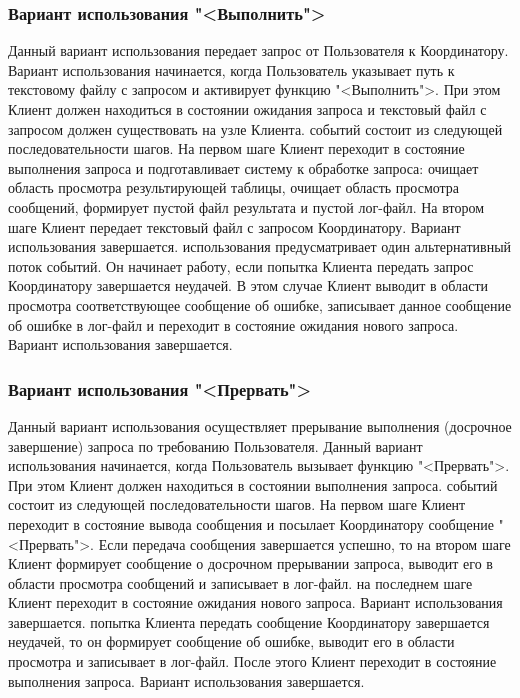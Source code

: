 \documentclass[11pt,oneside]{article}
\begin{document}
\subsubsection{Вариант использования "<Выполнить">}
Данный вариант использования передает запрос от Пользователя к Координатору. Вариант использования начинается, когда Пользователь указывает путь к текстовому файлу с запросом и активирует функцию "<Выполнить">. При этом Клиент должен находиться в состоянии ожидания запроса и текстовый файл с запросом должен существовать на узле Клиента.
 событий состоит из следующей последовательности шагов. На первом шаге Клиент переходит в состояние выполнения запроса и подготавливает систему к обработке запроса: очищает область просмотра результирующей таблицы, очищает область просмотра сообщений, формирует пустой файл результата и пустой лог-файл. На втором шаге Клиент передает текстовый файл с запросом Координатору. Вариант использования завершается.
 использования предусматривает один альтернативный поток событий. Он начинает работу, если попытка Клиента передать запрос Координатору завершается неудачей. В этом случае Клиент выводит в области просмотра соответствующее сообщение об ошибке, записывает данное сообщение об ошибке в лог-файл и переходит в состояние ожидания нового запроса. Вариант использования завершается.

\subsubsection{Вариант использования "<Прервать">}
Данный вариант использования осуществляет прерывание выполнения (досрочное завершение) запроса по требованию Пользователя. Данный вариант использования начинается, когда Пользователь вызывает функцию "<Прервать">. При этом Клиент должен находиться в состоянии выполнения запроса.
 событий состоит из следующей последовательности шагов. На первом шаге Клиент переходит в состояние вывода сообщения и посылает Координатору сообщение "<Прервать">. Если передача сообщения завершается успешно, то на втором шаге Клиент формирует сообщение о досрочном прерывании запроса, выводит его в области просмотра сообщений и записывает в лог-файл. на последнем шаге Клиент переходит в состояние ожидания нового запроса. Вариант использования завершается.
 попытка Клиента передать сообщение Координатору завершается неудачей, то он формирует сообщение об ошибке, выводит его в области просмотра и записывает в лог-файл. После этого Клиент переходит в состояние выполнения запроса. Вариант использования завершается.
\end{document}
